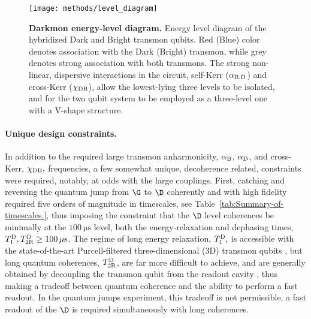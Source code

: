 \begin{figure}
\centering{}\texttt{[image: methods/level\_diagram]}
\caption[Darkmon energy-level diagram]{\textbf{Darkmon energy-level diagram.\label{fig:Darkmon-energy-level-diagram}}
Energy level diagram of the hybridized Dark and Bright transmon qubits.
Red (Blue) color denotes association with the Dark (Bright) transmon,
while grey denotes strong association with both transmons. The strong
non-linear, dispersive interactions in the circuit, self-Kerr ($\alpha_{{\rm B,D}}$)
and cross-Kerr ($\chi_{{\rm DB}}$), allow the lowest-lying three
levels to be isolated, and for the two qubit system to be employed
as a three-level one with a V-shape structure. }
\end{figure}


\paragraph{Unique design constraints. }

In addition to the required large transmon anharmonicity, $\alpha_{{\rm B}}$,
$\alpha_{{\rm D}}$, and cross-Kerr, $\chi_{{\rm DB}},$ frequencies,
a few somewhat unique, decoherence related, constraints were required,
notably, at odds with the large couplings. First, catching and reversing
the quantum jump from $\G$ to $\D$ coherently and with high fidelity
required five orders of magnitude in timescales, see Table~\ref{tab:Summary-of-timescales.},
thus imposing the constraint that the $\D$ level coherences be minimally
at the $100\ \mathrm{\mu s}$ level, both the energy-relaxation and
dephasing times, $T_{1}^{{\rm {\rm D}}},T_{{\rm 2R}}^{{\rm D}}\geq100\,\mathrm{\mu s}$.
The regime of long energy relaxation, $T_{1}^{{\rm {\rm D}}},$ is
accessible with the state-of-the-art Purcell-filtered three-dimensional
(3D) transmon qubits \citep{Paik2011,Wang2015,Dial2016}, but long
quantum coherences, $T_{{\rm 2R}}^{{\rm D}}$, are far more difficult
to achieve, and are generally obtained by decoupling the transmon
qubit from the readout cavity \citep{Gambetta2006-dephasing,Rigetti2012},
thus making a tradeoff between quantum coherence and the ability to
perform a fast readout. In the quantum jumps experiment, this tradeoff
is not permissible, a fast readout of the $\D$ is required simultaneously
with long coherences. 

